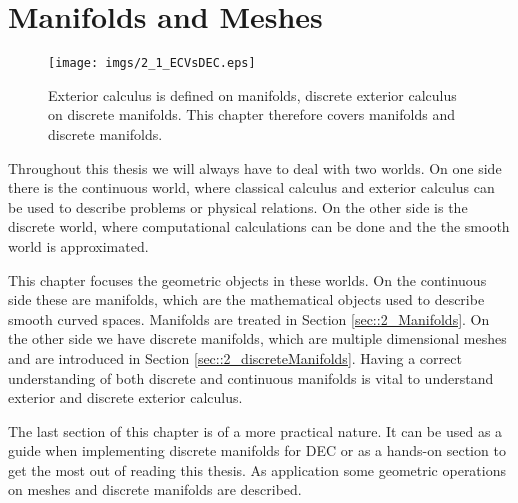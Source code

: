 \chapter{Manifolds and Meshes}


\begin{figure}[h]
\begin{center}
\texttt{[image: imgs/2\_1\_ECVsDEC.eps]}
\end{center}
\vspace{-0.5cm}
\caption{Exterior calculus is defined on manifolds, discrete exterior calculus on discrete manifolds. This chapter therefore covers manifolds and discrete manifolds.}
\end{figure}

Throughout this thesis we will always have to deal with two worlds. On one side there is the continuous world, where classical calculus and exterior calculus can be used to describe problems or physical relations. On the other side is the discrete world, where computational calculations can be done and the the smooth world is approximated.

This chapter focuses the geometric objects in these worlds. On the continuous side these are manifolds, which are the mathematical objects used to describe smooth curved spaces. Manifolds are treated in Section \ref{sec::2_Manifolds}. On the other side we have discrete manifolds, which are multiple dimensional meshes and are introduced in Section \ref{sec::2_discreteManifolds}. Having a correct  understanding of both discrete and continuous manifolds is vital to understand exterior and discrete exterior calculus.

The last section of this chapter is of a more practical nature. It can be used as a guide when implementing discrete manifolds for DEC or as a hands-on section to get the most out of reading this thesis. As application some geometric operations on meshes and discrete manifolds are described.



